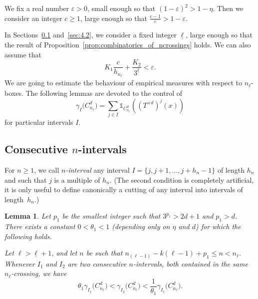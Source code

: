 \documentclass[10pt]{amsart}
\newtheorem{lemm}[theo]{Lemma}\newtheorem{prop}[theo]{Proposition}\newtheorem{coro}[theo]{Corollary}\newtheorem{conj}[theo]{Conjecture}
\theoremstyle{definition}\newtheorem{defi}[theo]{Definition}\newtheorem{rema}[theo]{Remark}\newtheorem{exam}[theo]{Example}\newtheorem{exem}[theo]{Example}\newtheorem{nota}[theo]{Notation}
\newcommand{\ind}[1]{\mathds{1}_{#1}}
\newcommand{\cd}{C^{d}}
\newcommand{\td}{T^{\times d}}
\newcommand{\lb}{\underline{\ell}}
\newcommand{\Gam}[1]{\gamma_{#1}\bigl(\cd_{n_{\lb}}\bigr)}
\begin{document}
We fix a real number $\varepsilon>0$, small enough so that $(1-\varepsilon)^2>1-\eta$. Then we consider an integer $c\ge1$, large enough so that $\frac{c-1}{c}>1-\varepsilon$.

In Sections~\ref{sec:4.1} and~\ref{sec:4.2}, we consider a fixed integer $\underline{\ell}$, large enough so that the result of Proposition~\ref{prop:combinatorics_of_ncrossings} holds. We can also assume that
\begin{equation}\label{eq:choice_of_lb}
K_1 \frac{c}{h_{n_{\lb}}} + \frac{K_2}{3^{\lb}} < \varepsilon.
\end{equation}
We are going to estimate the behaviour of empirical measures with respect to $n_{\lb}$-boxes. The following lemmas are devoted to the control of
\[
\Gam{I} = \sum_{j\in I} \ind{\cd_{n_{\lb}}} \left((\td)^j(x)\right)
\]
for particular intervals $I$.

\subsection{Consecutive \texorpdfstring{$n$}{n}-intervals}\label{sec:4.1}

For $n\ge1$, we call \emph{$n$-interval} any interval $I=\{j,j+1,\ldots,j+h_n-1\}$ of length $h_n$ and such that $j$ is a multiple of $h_n$. (The second condition is completely artificial, it is only useful to define canonically a cutting of any interval into intervals of length~$h_n$.)

\begin{lemm}\label{lemma:consecutive_n_intervals}
Let $p_1$ be the smallest integer such that $3^{p_1}>2d+1$ and $p_1>d$. There exists a constant $0<\theta_1<1$ (depending only on $\eta$ and $d$) for which the following holds.

Let $\ell>\lb+1$, and let $n$ be such that $n_{(\ell-1)}-k(\ell-1)+p_1\le n< n_\ell$. Whenever $I_1$ and $I_2$ are two consecutive $n$-intervals, both contained in the same $n_\ell$-crossing, we have
\[
\theta_1 \Gam{I_1} < \Gam{I_2} < \frac{1}{\theta_1} \Gam{I_1}.
\]
\end{lemm}
\end{document}
